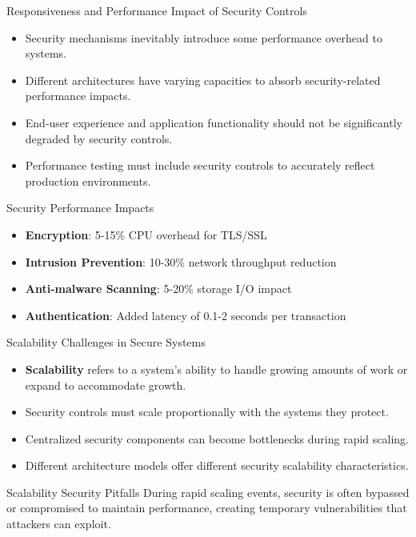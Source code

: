 \documentclass{beamer}
\begin{document}
        \begin{frame}{Responsiveness and Performance Impact of Security Controls}
        \begin{itemize}
        \item Security mechanisms inevitably introduce some performance overhead to systems.
        \item Different architectures have varying capacities to absorb security-related performance impacts.
        \item End-user experience and application functionality should not be significantly degraded by security controls.
        \item Performance testing must include security controls to accurately reflect production environments.
        \end{itemize}
        
        \begin{exampleblock}{Security Performance Impacts}
        \begin{itemize}
        \item \textbf{Encryption}: 5-15\% CPU overhead for TLS/SSL
        \item \textbf{Intrusion Prevention}: 10-30\% network throughput reduction
        \item \textbf{Anti-malware Scanning}: 5-20\% storage I/O impact
        \item \textbf{Authentication}: Added latency of 0.1-2 seconds per transaction
        \end{itemize}
        \end{exampleblock}
        \end{frame}
        
        \begin{frame}{Scalability Challenges in Secure Systems}
        \begin{itemize}
        \item \textbf{Scalability} refers to a system's ability to handle growing amounts of work or expand to accommodate growth.
        \item Security controls must scale proportionally with the systems they protect.
        \item Centralized security components can become bottlenecks during rapid scaling.
        \item Different architecture models offer different security scalability characteristics.
        \end{itemize}
        
        \begin{alertblock}{Scalability Security Pitfalls}
        During rapid scaling events, security is often bypassed or compromised to maintain performance, creating temporary vulnerabilities that attackers can exploit.
        \end{alertblock}
        \end{frame}
        
\end{document}
